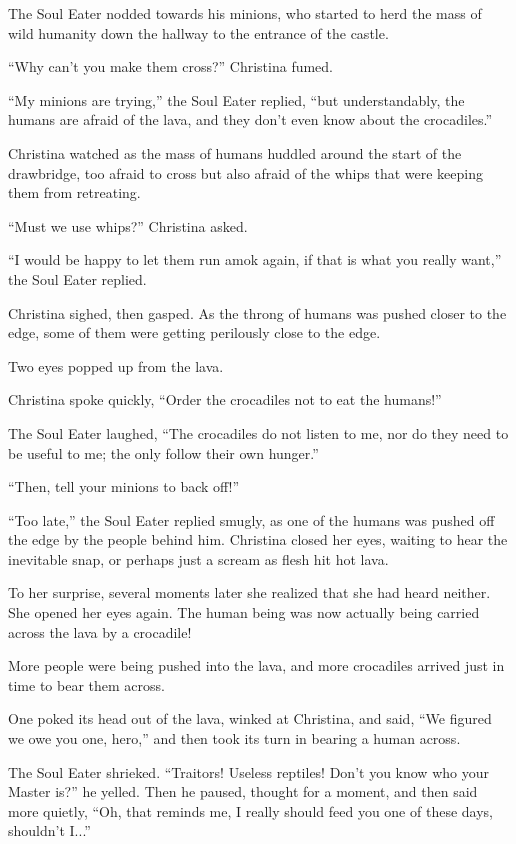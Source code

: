 \documentclass[showtrims,b6paper,draft,10pt]{memoir}
\begin{document}
The Soul Eater nodded towards his minions, who started to herd the mass of wild humanity down the hallway to the entrance of the castle.

\timeskip

``Why can't you make them cross?''  Christina fumed.

``My minions are trying,'' the Soul Eater replied, ``but understandably, the humans are afraid of the lava, and they don't even know about the crocadiles.''

Christina watched as the mass of humans huddled around the start of the drawbridge, too afraid to cross but also afraid of the whips that were keeping them from retreating.

``Must we use whips?'' Christina asked.

``I would be happy to let them run amok again, if that is what you really want,'' the Soul Eater replied.

Christina sighed, then gasped.  As the throng of humans was pushed closer to the edge, some of them were getting perilously close to the edge.

Two eyes popped up from the lava.

Christina spoke quickly, ``Order the crocadiles not to eat the humans!''

The Soul Eater laughed, ``The crocadiles do not listen to me, nor do they need to be useful to me;  the only follow their own hunger.''

``Then, tell your minions to back off!''

``Too late,'' the Soul Eater replied smugly, as one of the humans was pushed off the edge by the people behind him.  Christina closed her eyes, waiting to hear the inevitable snap, or perhaps just a scream as flesh hit hot lava.

To her surprise, several moments later she realized that she had heard neither.  She opened her eyes again.  The human being was now actually being carried across the lava by a crocadile!

More people were being pushed into the lava, and more crocadiles arrived just in time to bear them across.

One poked its head out of the lava, winked at Christina, and said, ``We figured we owe you one, hero,'' and then took its turn in bearing a human across.

The Soul Eater shrieked.  ``Traitors!  Useless reptiles!  Don't you know who your Master is?'' he yelled.  Then he paused, thought for a moment, and then said more quietly,  ``Oh, that reminds me, I really should feed you one of these days, shouldn't I...''
\end{document}
